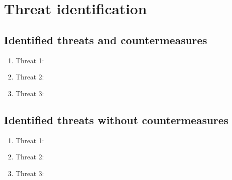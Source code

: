 \section{Threat identification}
\label{chapter5}

\subsection{Identified threats and countermeasures}


	\begin{enumerate}
		\item Threat 1: 
		\item Threat 2:
		\item Threat 3:
	\end{enumerate}
	
\subsection{Identified threats without countermeasures}

	\begin{enumerate}
		\item Threat 1: 
		\item Threat 2:
		\item Threat 3:
	\end{enumerate}